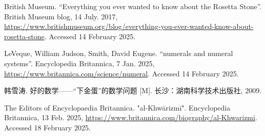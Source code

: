 \documentclass[b5paper]{ctexart}
\begin{document}
\begin{thebibliography}{99}

British Museum. ``Everything you ever wanted to know about the Rosetta Stone''. British Museum blog, 14 July. 2017, \url{https://www.britishmuseum.org/blog/everything-you-ever-wanted-know-about-rosetta-stone}. Accessed 14 February 2025.

LeVeque, William Judson, Smith, David Eugene. ``numerals and numeral systems''. Encyclopedia Britannica, 7 Jan. 2025, \url{https://www.britannica.com/science/numeral}. Accessed 14 February 2025.

韩雪涛. 好的数学——“下金蛋”的数学问题 [M]. 长沙：湖南科学技术出版社, 2009. %

The Editors of Encyclopaedia Britannica. "al-Khwārizmī". Encyclopedia Britannica, 13 Feb. 2025, \url{https://www.britannica.com/biography/al-Khwarizmi}. Accessed 18 February 2025.




\end{thebibliography}

\expandafter\enddocument

\fi
\end{document}
